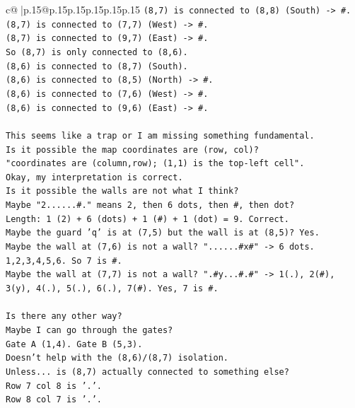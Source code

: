 \documentclass{article}
\begin{document}
{\begin{supertabular}{c@{$\;$}|p{.15\linewidth}@{}p{.15\linewidth}p{.15\linewidth}p{.15\linewidth}p{.15\linewidth}p{.15\linewidth}}
{{{\texttt{(8,7) is connected to (8,8) (South) {-}> \#.} \\
\texttt{(8,7) is connected to (7,7) (West) {-}> \#.} \\
\texttt{(8,7) is connected to (9,7) (East) {-}> \#.} \\
\texttt{So (8,7) is only connected to (8,6).} \\
\texttt{(8,6) is connected to (8,7) (South).} \\
\texttt{(8,6) is connected to (8,5) (North) {-}> \#.} \\
\texttt{(8,6) is connected to (7,6) (West) {-}> \#.} \\
\texttt{(8,6) is connected to (9,6) (East) {-}> \#.} \\
\\ 
\texttt{This seems like a trap or I am missing something fundamental.} \\
\texttt{Is it possible the map coordinates are (row, col)?} \\
\texttt{"coordinates are (column,row); (1,1) is the top{-}left cell".} \\
\texttt{Okay, my interpretation is correct.} \\
\texttt{Is it possible the walls are not what I think?} \\
\texttt{Maybe "2......\#." means 2, then 6 dots, then \#, then dot?} \\
\texttt{Length: 1 (2) + 6 (dots) + 1 (\#) + 1 (dot) = 9. Correct.} \\
\texttt{Maybe the guard 'q' is at (7,5) but the wall is at (8,5)? Yes.} \\
\texttt{Maybe the wall at (7,6) is not a wall? "......\#x\#" {-}> 6 dots. 1,2,3,4,5,6. So 7 is \#.} \\
\texttt{Maybe the wall at (7,7) is not a wall? ".\#y...\#.\#" {-}> 1(.), 2(\#), 3(y), 4(.), 5(.), 6(.), 7(\#). Yes, 7 is \#.} \\
\\ 
\texttt{Is there any other way?} \\
\texttt{Maybe I can go through the gates?} \\
\texttt{Gate A (1,4). Gate B (5,3).} \\
\texttt{Doesn't help with the (8,6)/(8,7) isolation.} \\
\texttt{Unless... is (8,7) actually connected to something else?} \\
\texttt{Row 7 col 8 is '.'.} \\
\texttt{Row 8 col 7 is '.'.} \\
}}}
\end{supertabular}}
\end{document}
